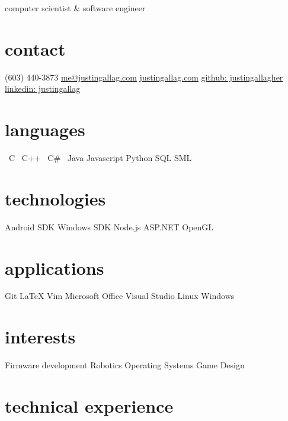\documentclass[]{friggeri-cv}
\newcommand{\starr}{\raisebox{0.2ex}{$\star $}}
\begin{document}
    {computer scientist \& software engineer}

    \begin{aside}
        \section{contact}
            (603) 440-3873
            \href{mailto:me@justingallag.com}{me@justingallag.com}
            \href{http://justingallag.com}{justingallag.com}
            \href{https://github.com/justingallagher}{github: justingallagher}
            \href{https://www.linkedin.com/in/justingallag}{linkedin: justingallag}
        \section{languages}
            \starr \ C
            \starr \ C++
            \starr \ C\#
            \starr \ Java
            Javascript
            Python
            SQL
            SML
        \section{technologies}
            Android SDK
            Windows SDK
            Node.js
            ASP.NET
            OpenGL
        \section{applications}
            Git
            LaTeX
            Vim
            Microsoft Office
            Visual Studio
            Linux
            Windows
        \section{interests}
            Firmware development
            Robotics
            Operating Systems
            Game Design
    \end{aside}

    \section{technical experience}
\end{document}
